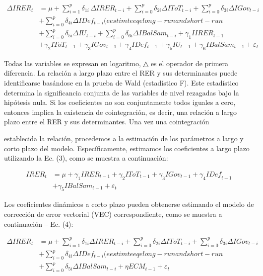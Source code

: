 \documentclass[11pt,a4paper]{article}
\begin{document}
$$\begin{split} \Delta IRER_t &= \mu + \sum_{i=1}^p \delta_{1i} \, \Delta IRER_{t-i} + \sum_{i=0}^p \delta_{2i} \Delta IToT_{t-i} + \sum_{i=0}^p \delta_{3i} \Delta IGov_{t-i} \\ &+ \sum_{i=0}^p \delta_{4i} \Delta IDef_{t-i} (eestimteeqelong - runandshort - run \\ &+ \sum_{i=0}^p \delta_{5i} \Delta IU_{t-i} + \sum_{i=0}^p \delta_{6i} \Delta IBalSam_{t-i} + \gamma_1 IIRER_{t-1} \\ &+ \gamma_2 IToT_{t-1} + \gamma_3 IGov_{t-1} + \gamma_4 IDef_{t-1} + \gamma_5 IU_{t-1} + \gamma_6 IBalSam_{t-1} + \varepsilon_t \end{split}$$

Todas las variables se expresan en logaritmo, △ es el operador de primera diferencia. La relación a largo plazo entre el RER y sus determinantes puede identificarse basándose en la prueba de Wald (estadístico F). Este estadístico determina la significancia conjunta de las variables de nivel rezagadas bajo la hipótesis nula. Si los coeficientes no son conjuntamente todos iguales a cero, entonces implica la existencia de cointegración, es decir, una relación a largo plazo entre el RER y sus determinantes. Una vez una cointegración

establecida la relación, procedemos a la estimación de los parámetros a largo y corto plazo del modelo. Específicamente, estimamos los coeficientes a largo plazo utilizando la Ec. (3), como se muestra a continuación:

$$\begin{split} \mathit{IRER}_t &= \mu + \gamma_1 \mathit{IRER}_{t-1} + \gamma_2 \mathit{IToT}_{t-1} + \gamma_3 \mathit{IGov}_{t-1} + \gamma_4 \mathit{IDef}_{t-1} \\ &+ \gamma_5 \mathit{IBalSam}_{t-1} + \varepsilon_t \end{split} \tag{3}$$

Los coeficientes dinámicos a corto plazo pueden obtenerse estimando el modelo de corrección de error vectorial (VEC) correspondiente, como se muestra a continuación – Ec. (4):

$$\begin{split} \Delta IRER_t &= \mu + \sum_{i=1}^p \delta_{1i} \Delta IRER_{t-i} + \sum_{i=0}^p \delta_{2i} \Delta IToT_{t-i} + \sum_{i=0}^p \delta_{3i} \Delta IGov_{t-i} \\ &+ \sum_{i=0}^p \delta_{4i} \Delta IDef_{t-i} (eestimteeqelong - runandshort - run \\ &+ \sum_{i=0}^p \delta_{5i} \Delta IBalSam_{t-i} + \eta ECM_{t-1} + \varepsilon_t \end{split}$$
\end{document}

